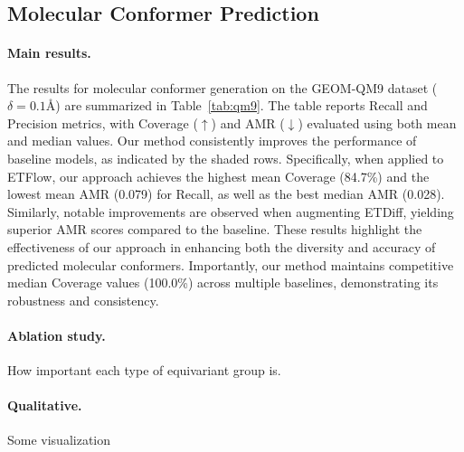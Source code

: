 \subsection{Molecular Conformer Prediction}


\paragraph{Main results.}





The results for molecular conformer generation on the GEOM-QM9 dataset ($\delta = 0.1\text{\AA}$) are summarized in Table~\ref{tab:qm9}. The table reports Recall and Precision metrics, with Coverage ($\uparrow$) and AMR ($\downarrow$) evaluated using both mean and median values. Our method consistently improves the performance of baseline models, as indicated by the shaded rows. Specifically, when applied to ETFlow, our approach achieves the highest mean Coverage (84.7\%) and the lowest mean AMR (0.079) for Recall, as well as the best median AMR (0.028). Similarly, notable improvements are observed when augmenting ETDiff, yielding superior AMR scores compared to the baseline. These results highlight the effectiveness of our approach in enhancing both the diversity and accuracy of predicted molecular conformers. Importantly, our method maintains competitive median Coverage values (100.0\%) across multiple baselines, demonstrating its robustness and consistency.


% 

\paragraph{Ablation study.} How important each type of equivariant group is.

\paragraph{Qualitative.} Some visualization

